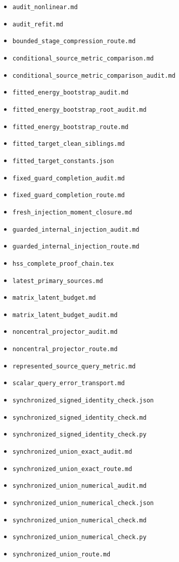 \documentclass[11pt,oneside,openany,a4paper]{report}
\numberwithin{equation}{chapter}
\theoremstyle{definition}
\theoremstyle{remark}
\newcommand{\sourcefile}[1]{{\small\nolinkurl{#1}}}
\begin{document}
\begin{itemize}[leftmargin=1.3em,itemsep=1pt,topsep=3pt]
\item \sourcefile{audit_nonlinear.md}
\item \sourcefile{audit_refit.md}
\item \sourcefile{bounded_stage_compression_route.md}
\item \sourcefile{conditional_source_metric_comparison.md}
\item \sourcefile{conditional_source_metric_comparison_audit.md}
\item \sourcefile{fitted_energy_bootstrap_audit.md}
\item \sourcefile{fitted_energy_bootstrap_root_audit.md}
\item \sourcefile{fitted_energy_bootstrap_route.md}
\item \sourcefile{fitted_target_clean_siblings.md}
\item \sourcefile{fitted_target_constants.json}
\item \sourcefile{fixed_guard_completion_audit.md}
\item \sourcefile{fixed_guard_completion_route.md}
\item \sourcefile{fresh_injection_moment_closure.md}
\item \sourcefile{guarded_internal_injection_audit.md}
\item \sourcefile{guarded_internal_injection_route.md}
\item \sourcefile{hss_complete_proof_chain.tex}
\item \sourcefile{latest_primary_sources.md}
\item \sourcefile{matrix_latent_budget.md}
\item \sourcefile{matrix_latent_budget_audit.md}
\item \sourcefile{noncentral_projector_audit.md}
\item \sourcefile{noncentral_projector_route.md}
\item \sourcefile{represented_source_query_metric.md}
\item \sourcefile{scalar_query_error_transport.md}
\item \sourcefile{synchronized_signed_identity_check.json}
\item \sourcefile{synchronized_signed_identity_check.md}
\item \sourcefile{synchronized_signed_identity_check.py}
\item \sourcefile{synchronized_union_exact_audit.md}
\item \sourcefile{synchronized_union_exact_route.md}
\item \sourcefile{synchronized_union_numerical_audit.md}
\item \sourcefile{synchronized_union_numerical_check.json}
\item \sourcefile{synchronized_union_numerical_check.md}
\item \sourcefile{synchronized_union_numerical_check.py}
\item \sourcefile{synchronized_union_route.md}
\end{itemize}
\end{document}
